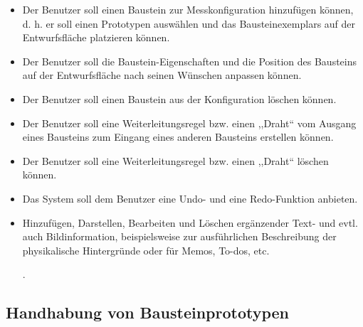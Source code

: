 \documentclass[parskip=full]{scrartcl}
\begin{document}
\begin{itemize}
	
	\item 
	\begin{MussKrit} 			
		Der Benutzer soll einen Baustein zur Messkonfiguration hinzufügen können, d. h. er soll einen Prototypen auswählen und das Bausteinexemplars auf der Entwurfsfläche platzieren können. 
	\end{MussKrit}
	
	\item 
	\begin{MussKrit} 		
		Der Benutzer soll die Baustein-Eigenschaften und die Position des Bausteins auf der Entwurfsfläche nach seinen Wünschen anpassen können.
	\end{MussKrit}
	
	\item 
	\begin{MussKrit} 			
		Der Benutzer soll einen Baustein aus der Konfiguration löschen können.
	\end{MussKrit}
	
	\item 
	\begin{MussKrit} 			
		Der Benutzer soll eine Weiterleitungsregel bzw. einen ,,Draht`` vom Ausgang eines Bausteins zum Eingang eines anderen Bausteins erstellen können.
	\end{MussKrit}
	
	\item 
	\begin{MussKrit} 			
		Der Benutzer soll eine Weiterleitungsregel bzw. einen ,,Draht`` löschen können.
	\end{MussKrit}
	
	\item 
	\begin{SollKrit} 			
		Das System soll dem Benutzer eine Undo- und eine Redo-Funktion anbieten.
	\end{SollKrit}
			
	\item 
	\begin{WunschKrit} 
		Hinzufügen, Darstellen, Bearbeiten und Löschen ergänzender Text- und evtl. auch Bildinformation, beispielsweise zur ausführlichen Beschreibung der physikalische Hintergründe oder für Memos, To-dos, etc.
	\end{WunschKrit}.
	
\end{itemize}

\subsection{Handhabung von Bausteinprototypen}
\end{document}
